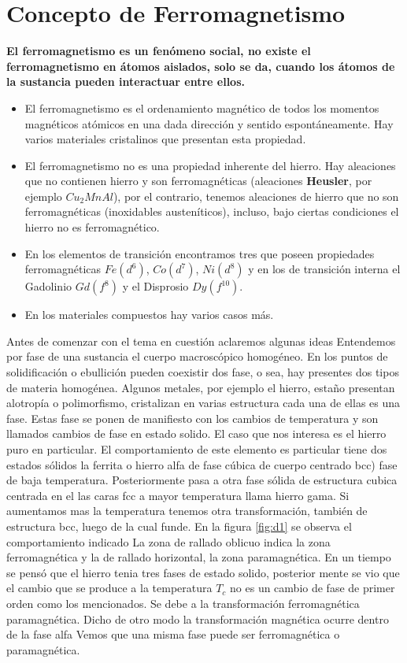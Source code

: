 \section{Concepto de Ferromagnetismo}

\textbf{El ferromagnetismo es un fenómeno social, no existe el ferromagnetismo en átomos aislados, solo se da, cuando los átomos de la sustancia pueden interactuar entre ellos.}

\begin{itemize}
	\item El ferromagnetismo es el ordenamiento magnético de todos los momentos magnéticos atómicos en una dada dirección y sentido espontáneamente. Hay varios materiales cristalinos que presentan esta propiedad.
	
	\item El ferromagnetismo no es una propiedad inherente del hierro. Hay aleaciones que no contienen hierro y son ferromagnéticas (aleaciones \textbf{Heusler}, por ejemplo $Cu_{2}MnAl$), por el contrario, tenemos aleaciones de hierro que no son ferromagnéticas (inoxidables austeníticos), incluso, bajo ciertas condiciones el hierro no es ferromagnético.

	\item En los elementos de transición encontramos tres que poseen propiedades ferromagnéticas $Fe(d^{6})$, $Co(d^{7})$, $Ni(d^{8})$ y en los de transición interna el Gadolinio $Gd(f^{8})$ y el Disprosio $Dy(f^{10})$.

	\item En los materiales compuestos hay varios casos más.

\end{itemize}


Antes de comenzar con el tema en cuestión aclaremos algunas ideas Entendemos por fase de una sustancia el cuerpo macroscópico homogéneo. En los puntos de solidificación o ebullición pueden coexistir dos fase, o sea, hay presentes dos tipos de materia homogénea. Algunos metales, por ejemplo el hierro, estaño presentan alotropía o polimorfismo, cristalizan en varias estructura cada una de ellas es una fase. Estas fase se ponen de manifiesto con los cambios de temperatura y son llamados cambios de fase en estado solido. El caso que nos interesa es el hierro puro en particular. El comportamiento de este elemento es particular tiene dos estados sólidos la ferrita o hierro alfa de fase cúbica de cuerpo centrado bcc) fase de baja temperatura. Posteriormente pasa a otra fase sólida de estructura cubica centrada en el las caras fcc a mayor temperatura llama hierro gama. Si aumentamos mas la temperatura tenemos otra transformación, también de estructura bcc, luego de la cual funde. En la figura \ref{fig:d1} se observa el comportamiento indicado La zona de rallado oblicuo indica la zona ferromagnética y la de rallado horizontal, la zona paramagnética. En un tiempo se pensó que el hierro tenia tres fases de estado solido, posterior mente se vio que el cambio que se produce a la temperatura $T_{c}$ no es un cambio de fase de primer orden como los mencionados. Se debe a la transformación ferromagnética paramagnética. Dicho de otro modo la transformación magnética ocurre dentro de la fase alfa Vemos que una misma fase puede ser ferromagnética o paramagnética.


